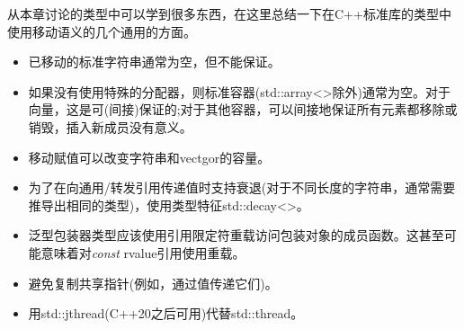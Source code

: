从本章讨论的类型中可以学到很多东西，在这里总结一下在C++标准库的类型中使用移动语义的几个通用的方面。\par

\begin{itemize}
	\item 已移动的标准字符串通常为空，但不能保证。
	\item 如果没有使用特殊的分配器，则标准容器(std::array<>除外)通常为空。对于向量，这是可(间接)保证的;对于其他容器，可以间接地保证所有元素都移除或销毁，插入新成员没有意义。
	\item 移动赋值可以改变字符串和vectgor的容量。
	\item 为了在向通用/转发引用传递值时支持衰退(对于不同长度的字符串，通常需要推导出相同的类型)，使用类型特征std::decay<>。
	\item 泛型包装器类型应该使用引用限定符重载访问包装对象的成员函数。这甚至可能意味着对\textit{const} rvalue引用使用重载。
	\item 避免复制共享指针(例如，通过值传递它们)。
	\item 用std::jthread(C++20之后可用)代替std::thread。
\end{itemize}


\newpage